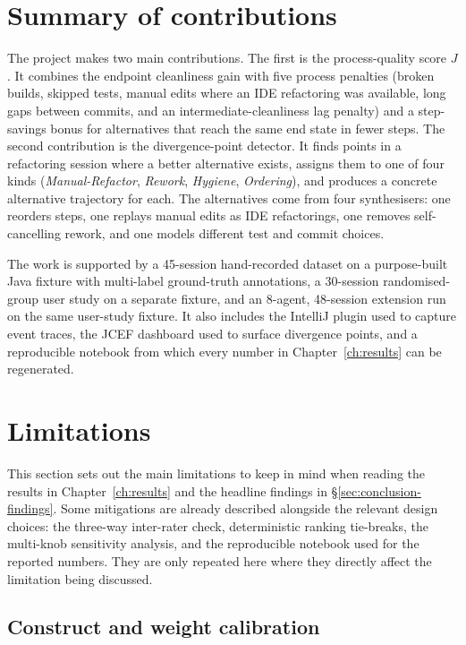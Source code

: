 \section{Summary of contributions}
\label{sec:conclusion-contributions}

The project makes two main contributions. The first is the process-quality score $J$. It combines the endpoint cleanliness gain with five process penalties (broken builds, skipped tests, manual edits where an IDE refactoring was available, long gaps between commits, and an intermediate-cleanliness lag penalty) and a step-savings bonus for alternatives that reach the same end state in fewer steps. The second contribution is the divergence-point detector. It finds points in a refactoring session where a better alternative exists, assigns them to one of four kinds (\emph{Manual-Refactor}, \emph{Rework}, \emph{Hygiene}, \emph{Ordering}), and produces a concrete alternative trajectory for each. The alternatives come from four synthesisers: one reorders steps, one replays manual edits as IDE refactorings, one removes self-cancelling rework, and one models different test and commit choices.

The work is supported by a 45-session hand-recorded dataset on a purpose-built Java fixture with multi-label ground-truth annotations, a 30-session randomised-group user study on a separate fixture, and an 8-agent, 48-session extension run on the same user-study fixture. It also includes the IntelliJ plugin used to capture event traces, the JCEF dashboard used to surface divergence points, and a reproducible notebook from which every number in Chapter~\ref{ch:results} can be regenerated.

\section{Limitations}
\label{sec:conclusion-limitations}

This section sets out the main limitations to keep in mind when reading the results in Chapter~\ref{ch:results} and the headline findings in \S\ref{sec:conclusion-findings}. Some mitigations are already described alongside the relevant design choices: the three-way inter-rater check, deterministic ranking tie-breaks, the multi-knob sensitivity analysis, and the reproducible notebook used for the reported numbers. They are only repeated here where they directly affect the limitation being discussed.

\subsection{Construct and weight calibration}
\label{sec:threats-construct}

